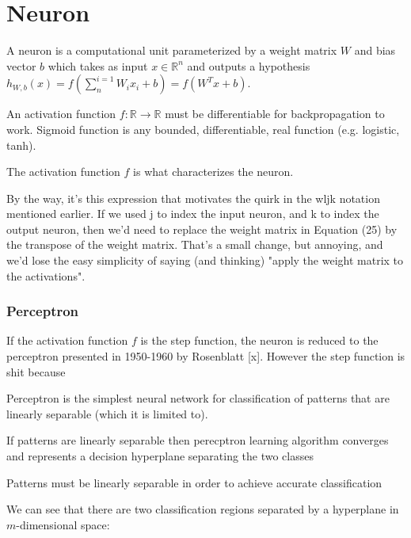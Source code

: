 \section{Neuron}

A neuron is a computational unit parameterized by a weight matrix $W$ and bias vector $b$ which takes as input $x \in \mathbb{R}^{n}$ and outputs a hypothesis $h_{W,b}(x) = f(\sum^{i=1}_{n} W_{i}x_{i} + b) = f(W^Tx + b)$.

An activation function $f \colon \mathbb{R} \to \mathbb{R}$ must be differentiable for backpropagation to work. Sigmoid function is any bounded, differentiable, real function (e.g. logistic, tanh).

The activation function $f$ is what characterizes the neuron.

By the way, it's this expression that motivates the quirk in the wljk notation mentioned earlier. If we used j to index the input neuron, and k to index the output neuron, then we'd need to replace the weight matrix in Equation (25) by the transpose of the weight matrix. That's a small change, but annoying, and we'd lose the easy simplicity of saying (and thinking) "apply the weight matrix to the activations".


\subsubsection{Perceptron}

If the activation function $f$ is the step function, the neuron is reduced to the perceptron presented in 1950-1960 by Rosenblatt [x]. However the step function is shit because

Perceptron is the simplest neural network for classification of patterns that are linearly separable (which it is limited to).



If patterns are linearly separable then perecptron learning algorithm converges and represents a decision hyperplane separating the two classes

Patterns must be linearly separable in order to achieve accurate classification


We can see that there are two classification regions separated by a hyperplane in $m$-dimensional space:

